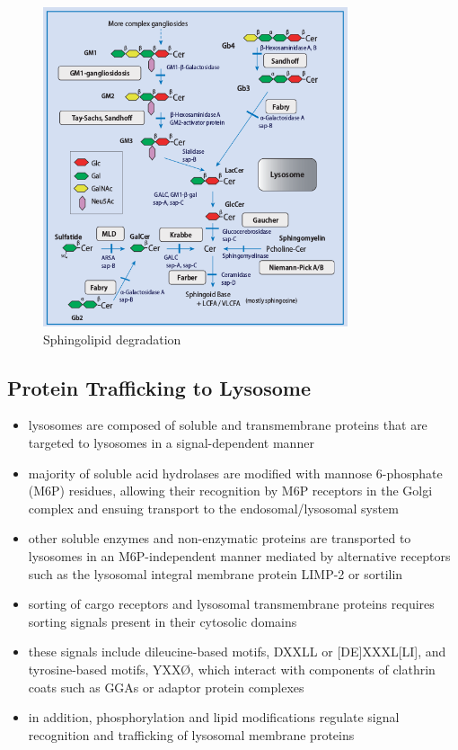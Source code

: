 \documentclass{scrartcl}
\begin{document}
\begin{figure}[htbp]
\centering
\includegraphics[width=0.8\textwidth]{./figures/sl_degradation.png}
\caption{\label{fig:orgfcc903c}
Sphingolipid degradation}
\end{figure}

\subsection{Protein Trafficking to Lysosome}
\label{sec:org421c78c}
\begin{itemize}
\item lysosomes are composed of soluble and transmembrane proteins that
are targeted to lysosomes in a signal-dependent manner
\item majority of soluble acid hydrolases are modified with mannose
6-phosphate (M6P) residues, allowing their recognition by M6P
receptors in the Golgi complex and ensuing transport to the
endosomal/lysosomal system
\item other soluble enzymes and non-enzymatic proteins are transported to
lysosomes in an M6P-independent manner mediated by alternative
receptors such as the lysosomal integral membrane protein LIMP-2 or
sortilin
\item sorting of cargo receptors and lysosomal transmembrane proteins
requires sorting signals present in their cytosolic domains
\item these signals include dileucine-based motifs, DXXLL or [DE]XXXL[LI],
and tyrosine-based motifs, YXXØ, which interact with components of
clathrin coats such as GGAs or adaptor protein complexes
\item in addition, phosphorylation and lipid modifications regulate signal
recognition and trafficking of lysosomal membrane proteins
\end{itemize}
\end{document}
